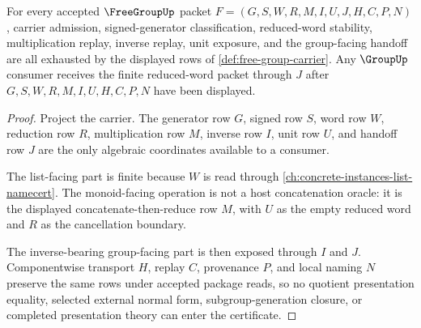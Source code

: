 \begin{theorem}
\label{thm:free-group-namecert-obligations}
For every accepted $\FreeGroupUp$ packet $F=(G,S,W,R,M,I,U,J,H,C,P,N)$, carrier admission, signed-generator classification, reduced-word stability, multiplication replay, inverse replay, unit exposure, and the group-facing handoff are all exhausted by the displayed rows of \autoref{def:free-group-carrier}. Any $\GroupUp$ consumer receives the finite reduced-word packet through $J$ after $G,S,W,R,M,I,U,H,C,P,N$ have been displayed.
\end{theorem}
\begin{proof}
Project the carrier. The generator row $G$, signed row $S$, word row $W$, reduction row $R$, multiplication row $M$, inverse row $I$, unit row $U$, and handoff row $J$ are the only algebraic coordinates available to a consumer.

The list-facing part is finite because $W$ is read through \autoref{ch:concrete-instances-list-namecert}. The monoid-facing operation is not a host concatenation oracle: it is the displayed concatenate-then-reduce row $M$, with $U$ as the empty reduced word and $R$ as the cancellation boundary.

The inverse-bearing group-facing part is then exposed through $I$ and $J$. Componentwise transport $H$, replay $C$, provenance $P$, and local naming $N$ preserve the same rows under accepted package reads, so no quotient presentation equality, selected external normal form, subgroup-generation closure, or completed presentation theory can enter the certificate.
\end{proof}

